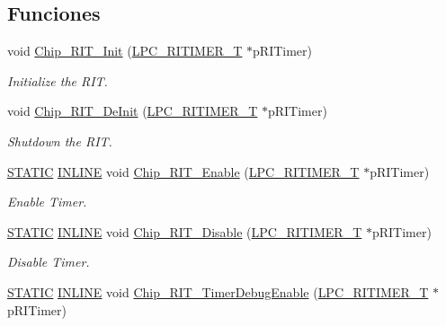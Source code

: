 \subsection*{Funciones}
\begin{DoxyCompactItemize}
\item 
void \hyperlink{group___r_i_t_i_m_e_r__18_x_x__43_x_x_ga9a8dc91573ba6d4556d787a62a8a3f7e}{Chip\+\_\+\+R\+I\+T\+\_\+\+Init} (\hyperlink{struct_l_p_c___r_i_t_i_m_e_r___t}{L\+P\+C\+\_\+\+R\+I\+T\+I\+M\+E\+R\+\_\+T} $\ast$p\+R\+I\+Timer)
\begin{DoxyCompactList}\small\item\em Initialize the R\+IT. \end{DoxyCompactList}\item 
void \hyperlink{group___r_i_t_i_m_e_r__18_x_x__43_x_x_ga31be6db37bc84b88664bd37e537bb881}{Chip\+\_\+\+R\+I\+T\+\_\+\+De\+Init} (\hyperlink{struct_l_p_c___r_i_t_i_m_e_r___t}{L\+P\+C\+\_\+\+R\+I\+T\+I\+M\+E\+R\+\_\+T} $\ast$p\+R\+I\+Timer)
\begin{DoxyCompactList}\small\item\em Shutdown the R\+IT. \end{DoxyCompactList}\item 
\hyperlink{group___l_p_c___types___public___macros_ga10b2d890d871e1489bb02b7e70d9bdfb}{S\+T\+A\+T\+IC} \hyperlink{spifi__18xx__43xx_8h_a2eb6f9e0395b47b8d5e3eeae4fe0c116}{I\+N\+L\+I\+NE} void \hyperlink{group___r_i_t_i_m_e_r__18_x_x__43_x_x_gaba98c3b55b7ca11112f49974f2cd6288}{Chip\+\_\+\+R\+I\+T\+\_\+\+Enable} (\hyperlink{struct_l_p_c___r_i_t_i_m_e_r___t}{L\+P\+C\+\_\+\+R\+I\+T\+I\+M\+E\+R\+\_\+T} $\ast$p\+R\+I\+Timer)
\begin{DoxyCompactList}\small\item\em Enable Timer. \end{DoxyCompactList}\item 
\hyperlink{group___l_p_c___types___public___macros_ga10b2d890d871e1489bb02b7e70d9bdfb}{S\+T\+A\+T\+IC} \hyperlink{spifi__18xx__43xx_8h_a2eb6f9e0395b47b8d5e3eeae4fe0c116}{I\+N\+L\+I\+NE} void \hyperlink{group___r_i_t_i_m_e_r__18_x_x__43_x_x_ga5ef90f2824763c979997e64ea8d6991b}{Chip\+\_\+\+R\+I\+T\+\_\+\+Disable} (\hyperlink{struct_l_p_c___r_i_t_i_m_e_r___t}{L\+P\+C\+\_\+\+R\+I\+T\+I\+M\+E\+R\+\_\+T} $\ast$p\+R\+I\+Timer)
\begin{DoxyCompactList}\small\item\em Disable Timer. \end{DoxyCompactList}\item 
\hyperlink{group___l_p_c___types___public___macros_ga10b2d890d871e1489bb02b7e70d9bdfb}{S\+T\+A\+T\+IC} \hyperlink{spifi__18xx__43xx_8h_a2eb6f9e0395b47b8d5e3eeae4fe0c116}{I\+N\+L\+I\+NE} void \hyperlink{group___r_i_t_i_m_e_r__18_x_x__43_x_x_gafc64603f85a635e7c6ebe67346fdafe4}{Chip\+\_\+\+R\+I\+T\+\_\+\+Timer\+Debug\+Enable} (\hyperlink{struct_l_p_c___r_i_t_i_m_e_r___t}{L\+P\+C\+\_\+\+R\+I\+T\+I\+M\+E\+R\+\_\+T} $\ast$p\+R\+I\+Timer)

\end{DoxyCompactItemize}
